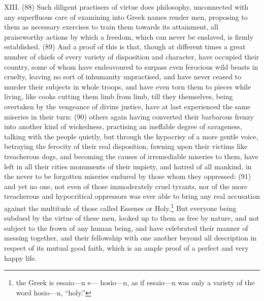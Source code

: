 XIII. (88) Such diligent practisers of virtue does philosophy, unconnected with any superfluous care
of examining into Greek names render men, proposing to them as necessary exercises to train
them towards its attainment, all praiseworthy actions by which a freedom, which can never be
enslaved, is firmly established. (89) And a proof of this is that, though at different times a great
number of chiefs of every variety of disposition and character, have occupied their country, some
of whom have endeavoured to surpass even ferocious wild beasts in cruelty, leaving no sort of
inhumanity unpractised, and have never ceased to murder their subjects in whole troops, and have
even torn them to pieces while living, like cooks cutting them limb from limb, till they themselves,
being overtaken by the vengeance of divine justice, have at last experienced the same miseries in
their turn: (90) others again having converted their barbarous frenzy into another kind of
wickedness, practising an ineffable degree of savageness, talking with the people quietly, but
through the hypocrisy of a more gentle voice, betraying the ferocity of their real disposition,
fawning upon their victims like treacherous dogs, and becoming the causes of irremediable
miseries to them, have left in all their cities monuments of their impiety, and hatred of all mankind,
in the never to be forgotten miseries endured by those whom they oppressed: (91) and yet no one,
not even of those immoderately cruel tyrants, nor of the more treacherous and hypocritical
oppressors was ever able to bring any real accusation against the multitude of those called
Essenes or Holy.\footnote{the Greek is essaio—n e— hosio—n, as if essaio—n was only a variety of the word hosio—n,
``holy.''} But everyone being subdued by the virtue of these men, looked up to them as free by nature,
and not subject to the frown of any human being, and have celebrated their manner of messing
together, and their fellowship with one another beyond all description in respect of its mutual good
faith, which is an ample proof of a perfect and very happy life.

